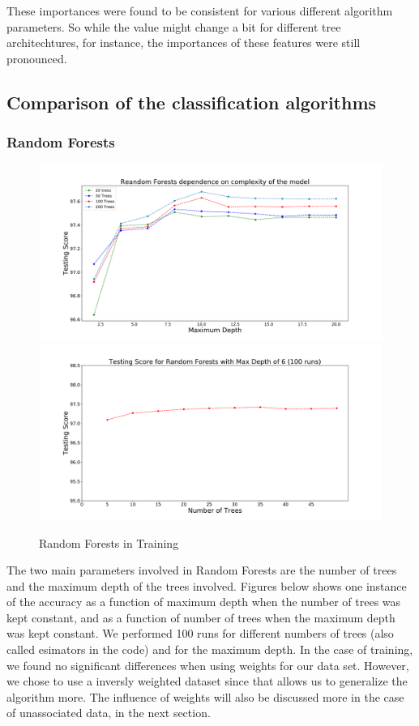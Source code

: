 These importances were found to be consistent for various different algorithm parameters. So while the value might change a bit for different tree architechtures, for instance, the importances of these features were still pronounced. \\
\subsection{Comparison of the classification algorithms}



\subsubsection{Random Forests}


\begin{figure}[h]
\includegraphics[width=\twopicsp\textwidth]{plots/assocvstrees} \\
\includegraphics[width=\twopicsp\textwidth]{plots/6md_trees_weighted}
\caption{
Random Forests in Training
}
\label{fig:Maps_data}
\end{figure}

The two main parameters involved in Random Forests are the number of trees and the maximum depth of the trees involved. Figures below shows one instance of the accuracy as a function of maximum depth when the number of trees was kept constant, and as a function of number of trees when the maximum depth was kept constant. We performed 100 runs for different numbers of trees (also called esimators in the code) and for the maximum depth. In the case of training, we found no significant differences when using weights for our data set. However, we chose to use a inversly weighted dataset since that allows us to generalize the algorithm more. The influence of weights will also be discussed more in the case of unassociated data, in the next section. \\

